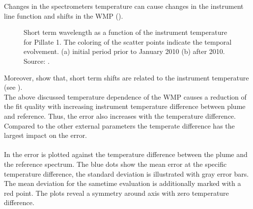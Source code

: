 Changes in the spectrometers temperature can cause changes in the instrument line function and shifts in the WMP (\citep{pinardi2007influence}). 
\begin{figure}		
	\caption{Short term wavelength as a function of the instrument temperature for Pillate 1. The coloring of the scatter points indicate the temporal evolvement. (a) initial period prior to January 2010 (b) after 2010. Source: \cite{WarnachSimon}.}
	\label{fig:shorttermshift}
\end{figure}
Moreover, \cite{WarnachSimon} show that, short term shifts are related to the instrument temperature (see ).\\
The above discussed temperature dependence of the WMP causes a reduction of the fit quality with increasing instrument temperature difference between plume and reference. Thus, the  error also increases with the temperature difference.
Compared to the other external parameters the temperate difference has the largest impact on the  error.\\
\\
In  the  error is plotted against the temperature difference between the plume and the reference spectrum. The blue dots show the mean  error at the specific temperature difference, the standard deviation is illustrated with gray error bars. The mean  deviation for the sametime evaluation is additionally marked with a red point. The plots reveal a symmetry around axis with zero temperature difference.
